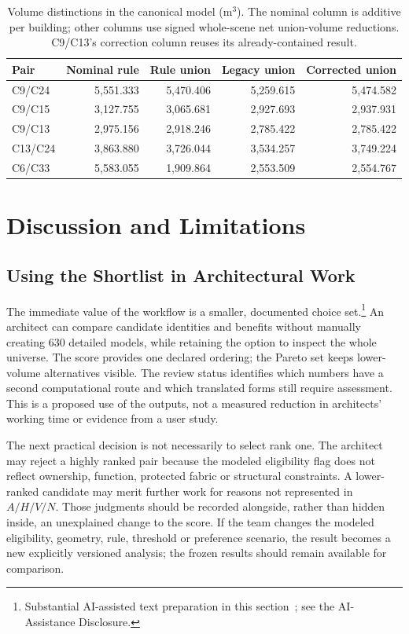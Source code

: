 \documentclass{llncs}
\newcommand{\aidraft}{\footnote{Substantial AI-assisted text preparation in this section~\cite{openai2026}; see the AI-Assistance Disclosure.}}
\begin{document}
\begin{table}[tbp]
\caption{Volume distinctions in the canonical model (m$^3$). The nominal column is additive per building; other columns use signed whole-scene net union-volume reductions. C9/C13's correction column reuses its already-contained result.}
\label{tab:volumes}\centering
\begin{tabular}{lrrrr}\toprule
Pair & Nominal rule & Rule union & Legacy union & Corrected union\\\midrule
C9/C24 & 5,551.333 & 5,470.406 & 5,259.615 & 5,474.582\\
C9/C15 & 3,127.755 & 3,065.681 & 2,927.693 & 2,937.931\\
C9/C13 & 2,975.156 & 2,918.246 & 2,785.422 & 2,785.422\\
C13/C24 & 3,863.880 & 3,726.044 & 3,534.257 & 3,749.224\\
C6/C33 & 5,583.055 & 1,909.864 & 2,553.509 & 2,554.767\\\bottomrule
\end{tabular}
\end{table}

\FloatBarrier
\section{Discussion and Limitations}
\subsection{Using the Shortlist in Architectural Work}
The immediate value of the workflow is a smaller, documented choice set.\aidraft{} An architect can compare candidate identities and benefits without manually creating 630 detailed models, while retaining the option to inspect the whole universe. The score provides one declared ordering; the Pareto set keeps lower-volume alternatives visible. The review status identifies which numbers have a second computational route and which translated forms still require assessment. This is a proposed use of the outputs, not a measured reduction in architects' working time or evidence from a user study.

The next practical decision is not necessarily to select rank one. The architect may reject a highly ranked pair because the modeled eligibility flag does not reflect ownership, function, protected fabric or structural constraints. A lower-ranked candidate may merit further work for reasons not represented in $A/H/V/N$. Those judgments should be recorded alongside, rather than hidden inside, an unexplained change to the score. If the team changes the modeled eligibility, geometry, rule, threshold or preference scenario, the result becomes a new explicitly versioned analysis; the frozen results should remain available for comparison.
\end{document}
